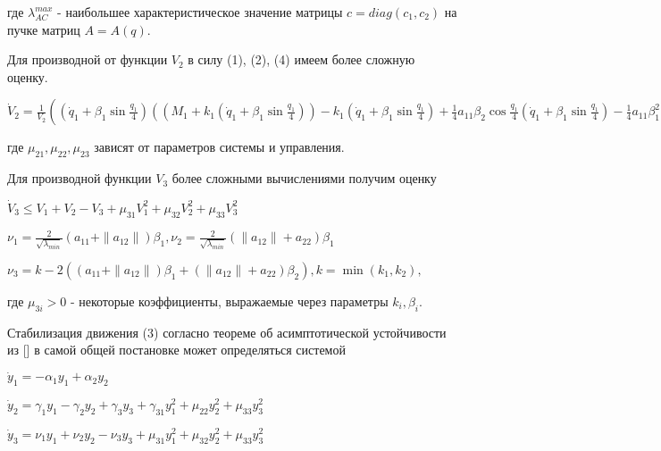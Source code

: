 где $\lambda_{AC}^{max}$ - наибольшее характеристическое значение матрицы $c = diag(c_1, c_2)$ на пучке матриц $A = A(q).$

Для производной от функции $V_2$ в силу (1), (2), (4) имеем более сложную оценку.

$\dot V_2 = \frac{1}{V_2} ((\dot q_1 + \beta_1 \sin \frac{q_1}{4}) ((M_1 + k_1 (\dot q_1 + \beta_1 \sin \frac{q_1}{4})) - k_1 (\dot q_1 + \beta_1 \sin \frac{q_1}{4}) + \frac{1}{4} a_{11} \beta_2 \cos \frac{q_1}{4} (\dot q_1 + \beta_1 \sin \frac{q_1}{4}) - \frac{1}{4} a_{11} \beta_1^2 \cos \frac{q_1}{4} \sin \frac{q_1}{4}) + 2 m_2 l_1 l_2 \sin q_2 (\dot q_2 + \beta_2 \sin \frac{q_2}{4} - \beta_2 \sin \frac{q_2}{4})^2) + (\dot q_2 + \beta_2 \sin \frac{q_2}{4}) (M_2 + k_2 (\dot q_2 + \beta_2 \sin \frac{q_2}{4}) - k_2 (\dot q_2 + \beta_2 \sin \frac{q_1}{4}) + \frac{1}{4} a_{12} \beta_2 \cos \frac{q_2}{4} (\dot q_2 + \beta_2 \sin \frac{q_2}{4}) - \frac{1}{4} a_{22} \beta_2^2 \cos \frac{q_2}{4} \sin \frac{q_2}{4} - m_2 l_1 l_2 \sin q_2 (\dot q_1 + \beta_1 \sin \frac{q_1}{4} - \beta_1 \sin \frac{q_1}{4})^2) \le \gamma_1 V_1 - \gamma_2 V_2 + \gamma_3 V_3 + \mu_{21} V_1^2 + \mu_{22} V_2^2 + \mu_{23} V_3^2, \gamma_1 = \frac{p_{max}}{\lambda_{min}}, \gamma_2 = \frac{1}{\lambda_{min}}, \gamma_3 = \frac{1}{4} a_{max} \beta_{max}$

где $\mu_{21}, \mu_{22}, \mu_{23}$ зависят от параметров системы и управления.

Для производной функции $V_3$ более сложными вычислениями получим оценку

$\dot V_3 \le V_1 + V_2 - V_3 + \mu_{31} V_1^2 + \mu_{32} V_2^2 + \mu_{33} V_3^2$

$\nu_1 = \frac{2}{\sqrt{\lambda_{min}}} (a_{11} + \| a_{12} \|) \beta_1, \nu_2 = \frac{2}{\sqrt{\lambda_{min}}} (\| a_{12} \| + a_{22}) \beta_1$

$\nu_3 = k - 2 ((a_{11} + \| a_{12} \|) \beta_1 + (\| a_{12} \| + a_{22}) \beta_2), k = \min (k_1, k_2), $

где $\mu_{3i} > 0$ - некоторые коэффициенты, выражаемые через параметры $k_i, \beta_i$.

Стабилизация движения (3) согласно теореме об асимптотической устойчивости из [] в самой общей постановке может определяться системой

$\dot y_1 = - \alpha_1 y_1 + \alpha_2 y_2$

$\dot y_2 = \gamma_1 y_1 - \gamma_2 y_2 + \gamma_3 y_3 + \gamma_{31} y_1^2 + \mu_{22} y_2^2 + \mu_{33} y_3^2$

$\dot y_3 = \nu_1 y_1 + \nu_2 y_2 - \nu_3 y_3 + \mu_{31} y_1^2 + \mu_{32} y_2^2 + \mu_{33} y_3^2$

